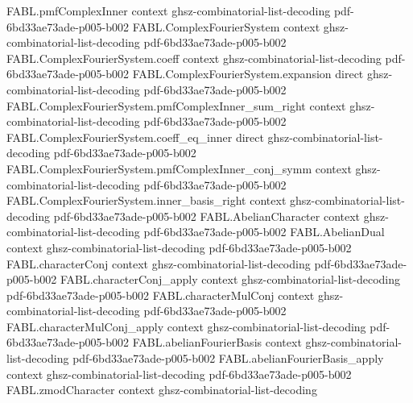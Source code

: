 \begin{theorem}
\label{FABL.ComplexFourierSystem.plancherel}
\leanok
{}
\proofstep
  {FABL.pmfComplexInner}
  {context}
  {ghsz-combinatorial-list-decoding}
  {pdf-6bd33ae73ade-p005-b002}
\proofstep
  {FABL.ComplexFourierSystem}
  {context}
  {ghsz-combinatorial-list-decoding}
  {pdf-6bd33ae73ade-p005-b002}
\proofstep
  {FABL.ComplexFourierSystem.coeff}
  {context}
  {ghsz-combinatorial-list-decoding}
  {pdf-6bd33ae73ade-p005-b002}
\proofstep
  {FABL.ComplexFourierSystem.expansion}
  {direct}
  {ghsz-combinatorial-list-decoding}
  {pdf-6bd33ae73ade-p005-b002}
\proofstep
  {FABL.ComplexFourierSystem.pmfComplexInner_sum_right}
  {context}
  {ghsz-combinatorial-list-decoding}
  {pdf-6bd33ae73ade-p005-b002}
\proofstep
  {FABL.ComplexFourierSystem.coeff_eq_inner}
  {direct}
  {ghsz-combinatorial-list-decoding}
  {pdf-6bd33ae73ade-p005-b002}
\proofstep
  {FABL.ComplexFourierSystem.pmfComplexInner_conj_symm}
  {context}
  {ghsz-combinatorial-list-decoding}
  {pdf-6bd33ae73ade-p005-b002}
\proofstep
  {FABL.ComplexFourierSystem.inner_basis_right}
  {context}
  {ghsz-combinatorial-list-decoding}
  {pdf-6bd33ae73ade-p005-b002}
\proofstep
  {FABL.AbelianCharacter}
  {context}
  {ghsz-combinatorial-list-decoding}
  {pdf-6bd33ae73ade-p005-b002}
\proofstep
  {FABL.AbelianDual}
  {context}
  {ghsz-combinatorial-list-decoding}
  {pdf-6bd33ae73ade-p005-b002}
\proofstep
  {FABL.characterConj}
  {context}
  {ghsz-combinatorial-list-decoding}
  {pdf-6bd33ae73ade-p005-b002}
\proofstep
  {FABL.characterConj_apply}
  {context}
  {ghsz-combinatorial-list-decoding}
  {pdf-6bd33ae73ade-p005-b002}
\proofstep
  {FABL.characterMulConj}
  {context}
  {ghsz-combinatorial-list-decoding}
  {pdf-6bd33ae73ade-p005-b002}
\proofstep
  {FABL.characterMulConj_apply}
  {context}
  {ghsz-combinatorial-list-decoding}
  {pdf-6bd33ae73ade-p005-b002}
\proofstep
  {FABL.abelianFourierBasis}
  {context}
  {ghsz-combinatorial-list-decoding}
  {pdf-6bd33ae73ade-p005-b002}
\proofstep
  {FABL.abelianFourierBasis_apply}
  {context}
  {ghsz-combinatorial-list-decoding}
  {pdf-6bd33ae73ade-p005-b002}
\proofstep
  {FABL.zmodCharacter}
  {context}
  {ghsz-combinatorial-list-decoding}

\end{theorem}

